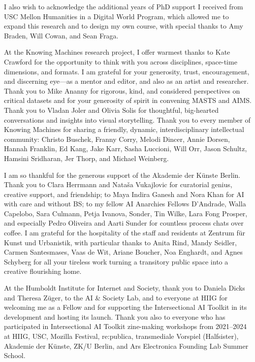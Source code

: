 I also wish to acknowledge the additional years of PhD support I
received from USC Mellon Humanities in a Digital World Program, which
allowed me to expand this research and to design my own course, with
special thanks to Amy Braden, Will Cowan, and Sean Fraga.

At the Knowing Machines research project, I offer warmest thanks to Kate
Crawford for the opportunity to think with you across disciplines,
space-time dimensions, and formats. I am grateful for your generosity,
trust, encouragement, and discerning eye---as a mentor and editor, and
also as an artist and researcher. Thank you to Mike Ananny for rigorous,
kind, and considered perspectives on critical datasets and for your
generosity of spirit in convening MASTS and AIMS. Thank you to Vladan
Joler and Olivia Solis for thoughtful, big-hearted conversations and
insights into visual storytelling. Thank you to every member of Knowing
Machines for sharing a friendly, dynamic, interdisciplinary intellectual
community: Christo Buschek, Franny Corry, Melodi Dincer, Annie Dorsen,
Hannah Franklin, Ed Kang, Jake Karr, Sasha Luccioni, Will Orr, Jason
Schultz, Hamsini Sridharan, Jer Thorp, and Michael Weinberg.

I am so thankful for the generous support of the Akademie der Künste
Berlin. Thank you to Clara Herrmann and Nataša Vukajlovic for curatorial
genius, creative support, and friendship; to Maya Indira Ganesh and Nora
Khan for AI with care and without BS; to my fellow AI Anarchies Fellows
D'Andrade, Walla Capelobo, Sara Culmann, Petja Ivanova, Sonder, Tin
Wilke, Lara Fong Prosper, and especially Pedro Oliveira and Aarti Sunder
for countless process chats over coffee. I am grateful for the
hospitality of the staff and residents at Zentrum für Kunst und
Urbanistik, with particular thanks to Anita Rind, Mandy Seidler, Carmen
Santesmases, Vaas de Wit, Ariane Boucher, Noa Enghardt, and Agnes
Schyberg for all your tireless work turning a transitory public space
into a creative flourishing home.

At the Humboldt Institute for Internet and Society, thank you to Daniela
Dicks and Theresa Züger, to the AI \& Society Lab, and to everyone at
HIIG for welcoming me as a Fellow and for supporting the Intersectional
AI Toolkit in its development and hosting its launch. Thank you also to
everyone who has participated in Intersectional AI Toolkit zine-making
workshops from 2021--2024 at HIIG, USC, Mozilla Festival, re:publica,
transmediale Vorspiel (Halfsister), Akademie der Künste, ZK/U Berlin,
and Ars Electronica Founding Lab Summer School.

